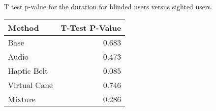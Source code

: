 
\centering
\caption{T test p-value for the duration for blinded users versus sighted users.}
\label{tab:ttest_duration}
\begin{tabular}{lr}
\toprule
      Method &  T-Test P-Value \\
\midrule
        Base &           0.683 \\
       Audio &           0.473 \\
 Haptic Belt &           0.085 \\
Virtual Cane &           0.746 \\
     Mixture &           0.286 \\
\bottomrule
\end{tabular}
